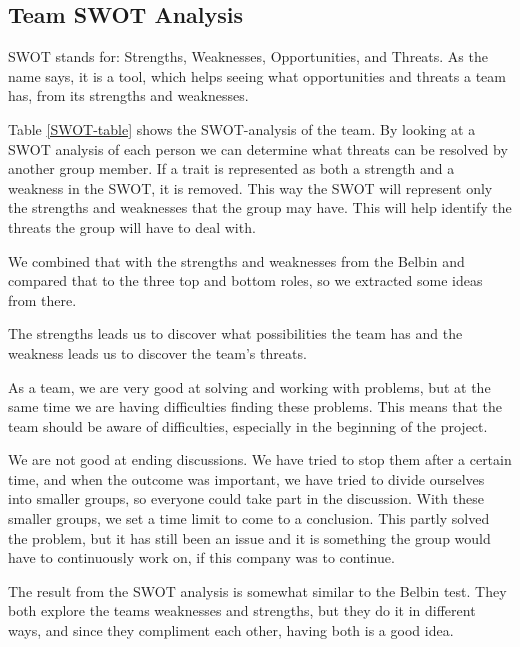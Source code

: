 \subsection{Team SWOT Analysis} 
SWOT stands for: Strengths, Weaknesses, Opportunities, and Threats. As the name says, it is a tool, which helps seeing what opportunities and threats a team has, from its strengths and weaknesses. 
 
Table \ref{SWOT-table} shows the SWOT-analysis of the team. 
By looking at a SWOT analysis of each person we can determine what threats can be resolved by another group member.
If a trait is represented as both a strength and a weakness in the SWOT, it is removed. This way the SWOT will represent only the strengths and weaknesses that the group may have. This will help identify the threats the group will have to deal with.

We combined that with the strengths and weaknesses from the Belbin and compared that to the three top and bottom roles, so we extracted some ideas from there.

The strengths leads us to discover what possibilities the team has and the weakness leads us to discover the team's threats. 

As a team, we are very good at solving and working with problems, but at the same time we are having difficulties finding these problems. 
This means that the team should be aware of difficulties, especially in the beginning of the project.

We are not good at ending discussions. We have tried to stop them after a certain time, and when the outcome was important, we have tried to divide ourselves into smaller groups, so everyone could take part in the discussion. With these smaller groups, we set a time limit to come to a conclusion. This partly solved the problem, but it has still been an issue and it is something the group would have to continuously work on, if this company was to continue. 


The result from the SWOT analysis is somewhat similar to the Belbin test. They both explore the teams weaknesses and strengths, but they do it in different ways, and since they compliment each other, having both is a good idea.


